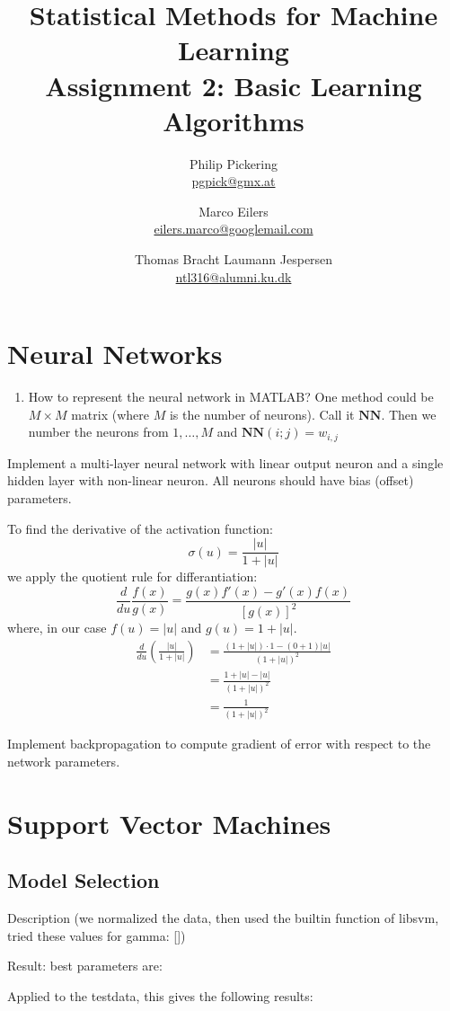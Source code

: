 \documentclass{article}
\author{Philip Pickering\\ \url{pgpick@gmx.at} \and Marco Eilers\\ \url{eilers.marco@googlemail.com} \and Thomas Bracht Laumann Jespersen\\ \url{ntl316@alumni.ku.dk}}
\title{Statistical Methods for Machine Learning\\ Assignment 2: Basic Learning Algorithms}
\date{}
\newcommand{\vect}[1]{\ensuremath{\boldsymbol{\mathbf{#1}}}\xspace}
\begin{document}
\maketitle

\section{Neural Networks}

\begin{enumerate}\setlength{\itemsep}{-3pt}
  \item How to represent the neural network in MATLAB? One method
    could be $M\times M$ matrix (where $M$ is the number of
    neurons). Call it \vect{NN}. Then we number the neurons from
    $1,\dots,M$ and $\vect{NN}(i;j) = w_{i,j}$
\end{enumerate}

Implement a multi-layer neural network with linear output neuron and a
single hidden layer with non-linear neuron. All neurons should have
bias (offset) parameters.

To find the derivative of the activation function:
\[
\sigma(u) = \frac{|u|}{1 + |u|}
\]
we apply the quotient rule for differantiation:
\[
\frac{d}{du}\frac{f(x)}{g(x)} = \frac{g(x)f'(x) - g'(x)f(x)}{\left[g(x)\right]^2}
\]
where, in our case $f(u) = |u|$ and $g(u) = 1 + |u|$.
\begin{align}
  \frac{d}{du}\left(\frac{|u|}{1 + |u|}\right) &= \frac{(1 + |u|)\cdot 1 - (0 + 1)|u|}{(1 + |u|)^2}\\
  &= \frac{1 + |u| - |u|}{(1 + |u|)^2}\\
  &= \frac{1}{(1 + |u|)^2}
\end{align}

Implement backpropagation to compute gradient of error with respect to
the network parameters.

\section{Support Vector Machines}

\subsection{Model Selection}
Description (we normalized the data, then used the builtin function of libsvm, tried these values for gamma: [])

Result: best parameters are:

Applied to the testdata, this gives the following results:
\end{document}
